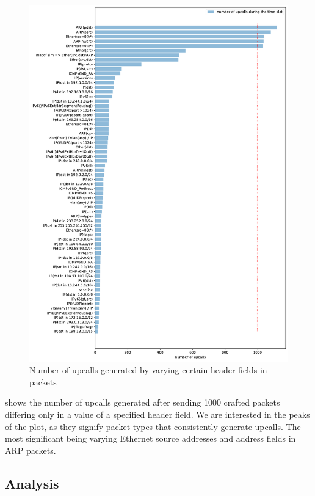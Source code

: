 \begin{figure}
    \centering
    \includegraphics[width=\linewidth]{img/packet_fuzz.pdf}
    \caption{Number of upcalls generated by varying certain header fields in packets}
    \label{fig:plot-packet-fuzz}
\end{figure}

 shows the number of upcalls generated after sending 1000 crafted packets differing only in a value of a specified header field. We are interested in the peaks of the plot, as they signify packet types that consistently generate upcalls. The most significant being varying Ethernet source addresses and address fields in ARP packets.

\subsection{Analysis}

